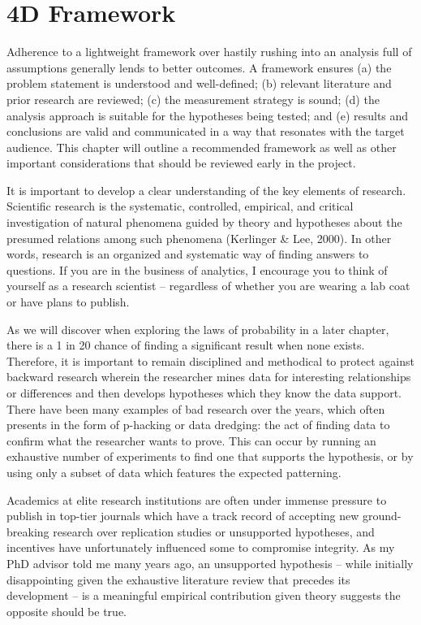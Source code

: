 \documentclass[]{book}
\begin{document}
\hypertarget{d-framework}{%
\section{4D Framework}\label{d-framework}}

Adherence to a lightweight framework over hastily rushing into an analysis full of assumptions generally lends to better outcomes. A framework ensures (a) the problem statement is understood and well-defined; (b) relevant literature and prior research are reviewed; (c) the measurement strategy is sound; (d) the analysis approach is suitable for the hypotheses being tested; and (e) results and conclusions are valid and communicated in a way that resonates with the target audience. This chapter will outline a recommended framework as well as other important considerations that should be reviewed early in the project.

It is important to develop a clear understanding of the key elements of research. Scientific research is the systematic, controlled, empirical, and critical investigation of natural phenomena guided by theory and hypotheses about the presumed relations among such phenomena (Kerlinger \& Lee, 2000). In other words, research is an organized and systematic way of finding answers to questions. If you are in the business of analytics, I encourage you to think of yourself as a research scientist -- regardless of whether you are wearing a lab coat or have plans to publish.

As we will discover when exploring the laws of probability in a later chapter, there is a 1 in 20 chance of finding a significant result when none exists. Therefore, it is important to remain disciplined and methodical to protect against backward research wherein the researcher mines data for interesting relationships or differences and then develops hypotheses which they know the data support. There have been many examples of bad research over the years, which often presents in the form of p-hacking or data dredging: the act of finding data to confirm what the researcher wants to prove. This can occur by running an exhaustive number of experiments to find one that supports the hypothesis, or by using only a subset of data which features the expected patterning.

Academics at elite research institutions are often under immense pressure to publish in top-tier journals which have a track record of accepting new ground-breaking research over replication studies or unsupported hypotheses, and incentives have unfortunately influenced some to compromise integrity. As my PhD advisor told me many years ago, an unsupported hypothesis -- while initially disappointing given the exhaustive literature review that precedes its development -- is a meaningful empirical contribution given theory suggests the opposite should be true.
\end{document}
